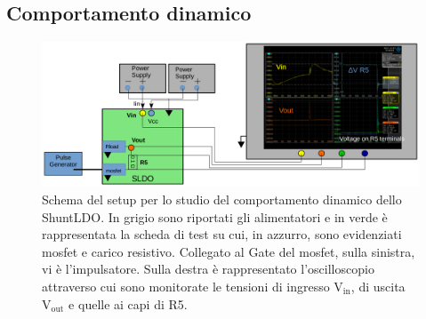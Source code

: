 %
%


\subsection{Comportamento dinamico}

\begin{figure}[!htb]
\centering
\includegraphics[scale=.3]{Immagini/SetupScheme}
\caption{Schema del setup per lo studio del comportamento dinamico dello ShuntLDO. In grigio sono riportati gli alimentatori e in verde è rappresentata la scheda di test su cui, in azzurro, sono evidenziati mosfet e carico resistivo. Collegato al Gate del mosfet, sulla sinistra, vi è l'impulsatore. Sulla destra è rappresentato l'oscilloscopio attraverso cui sono monitorate le tensioni di ingresso $\mathrm{V_{in}}$, di uscita $\mathrm{V_{out}}$ e quelle ai capi di R5.}
\label{Setupscheme}
\end{figure}

